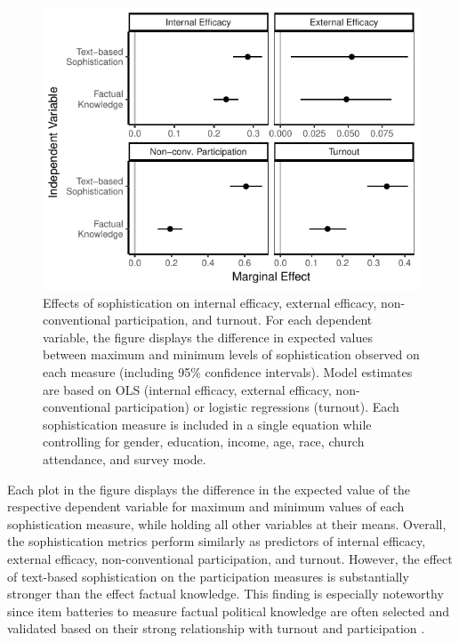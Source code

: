 \documentclass[12pt]{article}
\begin{document}
\begin{figure}[h]\centering
\includegraphics{../fig/knoweff_pres.pdf}
\caption{Effects of sophistication on internal efficacy, external efficacy, non-conventional participation, and turnout. For each dependent variable, the figure displays the difference in expected values between maximum and minimum levels of sophistication observed on each measure (including 95\% confidence intervals). Model estimates are based on OLS (internal efficacy, external efficacy, non-conventional participation) or logistic regressions (turnout). Each sophistication measure is included in a single equation while controlling for gender, education, income, age, race, church attendance, and survey mode.
}\label{fig:knoweff}
\end{figure}

Each plot in the figure displays the difference in the expected value of the respective dependent variable for maximum and minimum values of each sophistication measure, while holding all other variables at their means. Overall, the sophistication metrics perform similarly as predictors of internal efficacy, external efficacy, non-conventional participation, and turnout. However, the effect of text-based sophistication on the participation measures is substantially stronger than the effect factual knowledge. This finding is especially noteworthy since item batteries to measure factual political knowledge are often selected and validated based on their strong relationship with turnout and participation \citep[c.f.,][]{lupia2015uninformed}. 
\end{document}
